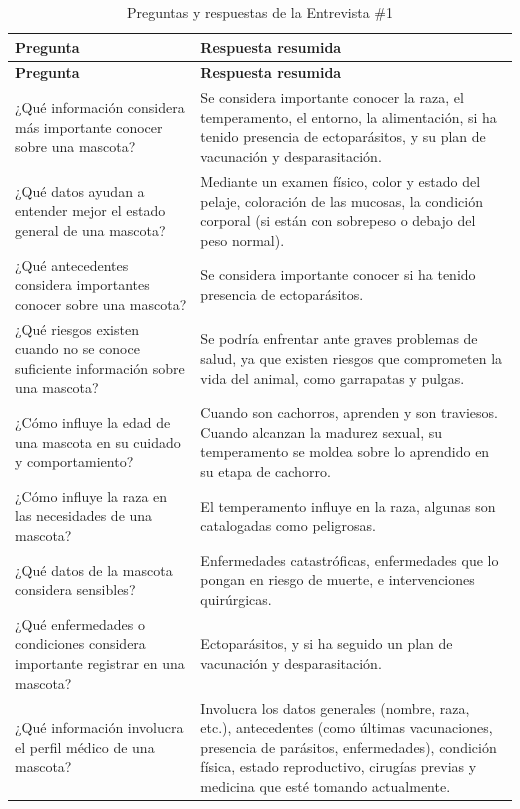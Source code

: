 \documentclass[journal,onecolumn]{IEEEtran}
\begin{document}
\begin{longtable}{|p{7.5cm}|p{7.5cm}|}
\caption{Preguntas y respuestas de la Entrevista \#1}
\label{tab:pr_e1}\\
\hline
\textbf{Pregunta} & \textbf{Respuesta resumida} \\
\hline
\endfirsthead
\hline
\textbf{Pregunta} & \textbf{Respuesta resumida} \\
\hline
\endhead
¿Qué información considera más importante conocer sobre una mascota? & Se considera importante conocer la raza, el temperamento, el entorno, la alimentación, si ha tenido presencia de ectoparásitos, y su plan de vacunación y desparasitación. \\
\hline
¿Qué datos ayudan a entender mejor el estado general de una mascota? & Mediante un examen físico, color y estado del pelaje, coloración de las mucosas, la condición corporal (si están con sobrepeso o debajo del peso normal). \\
\hline
¿Qué antecedentes considera importantes conocer sobre una mascota? & Se considera importante conocer si ha tenido presencia de ectoparásitos. \\
\hline
¿Qué riesgos existen cuando no se conoce suficiente información sobre una mascota? & Se podría enfrentar ante graves problemas de salud, ya que existen riesgos que comprometen la vida del animal, como garrapatas y pulgas. \\
\hline
¿Cómo influye la edad de una mascota en su cuidado y comportamiento? & Cuando son cachorros, aprenden y son traviesos. Cuando alcanzan la madurez sexual, su temperamento se moldea sobre lo aprendido en su etapa de cachorro. \\
\hline
¿Cómo influye la raza en las necesidades de una mascota? & El temperamento influye en la raza, algunas son catalogadas como peligrosas. \\
\hline
¿Qué datos de la mascota considera sensibles? & Enfermedades catastróficas, enfermedades que lo pongan en riesgo de muerte, e intervenciones quirúrgicas. \\
\hline
¿Qué enfermedades o condiciones considera importante registrar en una mascota? & Ectoparásitos, y si ha seguido un plan de vacunación y desparasitación. \\
\hline
¿Qué información involucra el perfil médico de una mascota? & Involucra los datos generales (nombre, raza, etc.), antecedentes (como últimas vacunaciones, presencia de parásitos, enfermedades), condición física, estado reproductivo, cirugías previas y medicina que esté tomando actualmente. \\

\end{longtable}
\end{document}
